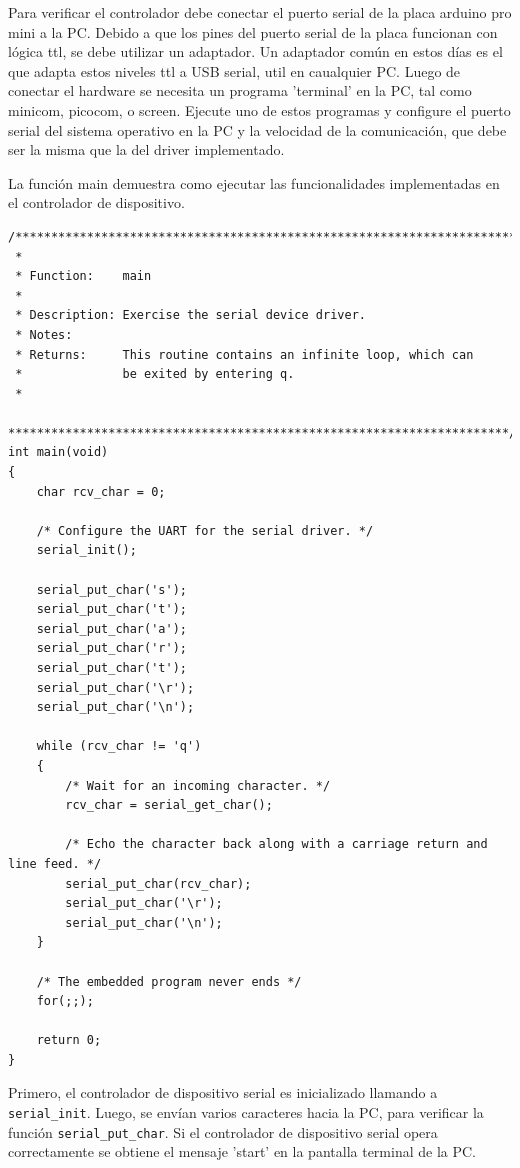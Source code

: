 \documentclass[output=paper, 
colorlinks,
citecolor=brown,
newtxmath
]{langscibook}
\begin{document}
Para verificar el controlador debe conectar el puerto serial de la placa
arduino pro mini a la PC. Debido a que los pines del puerto serial de la placa
funcionan con lógica ttl, se debe utilizar un adaptador. Un adaptador
común en estos días es el que adapta estos niveles ttl a USB serial, util 
en caualquier PC.
Luego de conectar el hardware se necesita un programa 'terminal' en la PC, tal
como minicom, picocom, o screen. Ejecute uno de estos programas
y configure el puerto serial del sistema operativo en la PC y la
velocidad de la comunicación, que debe ser la misma que la del driver 
implementado.

La función main demuestra como ejecutar las funcionalidades implementadas
en el controlador de dispositivo.

\begin{small}
\begin{verbatim}
/**********************************************************************
 *
 * Function:    main
 *
 * Description: Exercise the serial device driver.
 * Notes:       
 * Returns:     This routine contains an infinite loop, which can
 *              be exited by entering q.
 *
 **********************************************************************/
int main(void)
{
    char rcv_char = 0;

    /* Configure the UART for the serial driver. */
    serial_init();

    serial_put_char('s');
    serial_put_char('t');
    serial_put_char('a');
    serial_put_char('r');
    serial_put_char('t');
    serial_put_char('\r');
    serial_put_char('\n');

    while (rcv_char != 'q')
    {
        /* Wait for an incoming character. */
        rcv_char = serial_get_char();

        /* Echo the character back along with a carriage return and line feed. */
        serial_put_char(rcv_char);
        serial_put_char('\r');
        serial_put_char('\n');
    }

    /* The embedded program never ends */
    for(;;);

    return 0;
}
\end{verbatim}
\end{small}

Primero, el controlador de dispositivo serial es inicializado llamando 
a \texttt{serial\_init}. Luego, se envían varios caracteres hacia la PC, para 
verificar la función \texttt{serial\_put\_char}. Si el controlador de dispositivo serial
opera correctamente se obtiene el mensaje 'start' en la pantalla terminal
de la PC.
\end{document}
